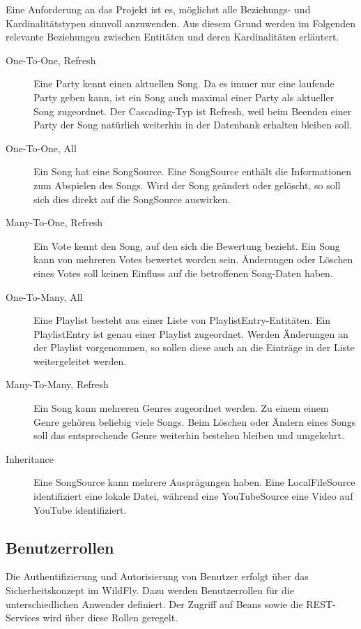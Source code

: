 Eine Anforderung an das Projekt ist es, möglichst alle Beziehungs- und Kardinalitätstypen sinnvoll anzuwenden. Aus diesem Grund werden im Folgenden relevante Beziehungen zwischen Entitäten und deren Kardinalitäten erläutert.

\begin{description}
	\item[One-To-One, Refresh] Eine Party kennt einen aktuellen Song. Da es immer nur eine laufende Party geben kann, ist ein Song auch maximal einer Party als aktueller Song zugeordnet. Der Cascading-Typ ist Refresh, weil beim Beenden einer Party der Song natürlich weiterhin in der Datenbank erhalten bleiben soll.
	\item[One-To-One, All] Ein Song hat eine SongSource. Eine SongSource enthält die Informationen zum Abspielen des Songs. Wird der Song geändert oder gelöscht, so soll sich dies direkt auf die SongSource auswirken.
	\item[Many-To-One, Refresh] Ein Vote kennt den Song, auf den sich die Bewertung bezieht. Ein Song kann von mehreren Votes bewertet worden sein. Änderungen oder Löschen eines Votes soll keinen Einfluss auf die betroffenen Song-Daten haben.
	\item[One-To-Many, All] Eine Playlist besteht aus einer Liste von PlaylistEntry-Entitäten. Ein PlaylistEntry ist genau einer Playlist zugeordnet. Werden Änderungen an der Playlist vorgenommen, so sollen diese auch an die Einträge
	in der Liste weitergeleitet werden.
	\item[Many-To-Many, Refresh] Ein Song kann mehreren Genres zugeordnet werden. Zu einem einem Genre gehören beliebig viele Songs. Beim Löschen oder Ändern eines Songs soll das entsprechende Genre weiterhin bestehen bleiben und umgekehrt.
	\item[Inheritance] Eine SongSource kann mehrere Ausprägungen haben. Eine LocalFileSource identifiziert eine lokale Datei, während eine YouTubeSource eine Video auf YouTube identifiziert.
\end{description}



\subsection{Benutzerrollen}
\label{sec:Benutzerrollen}
Die Authentifizierung und Autorisierung von Benutzer erfolgt über das Sicherheitskonzept im WildFly. Dazu werden Benutzerrollen für die unterschiedlichen Anwender definiert. Der Zugriff auf Beans sowie die REST-Services wird über diese Rollen geregelt. 

